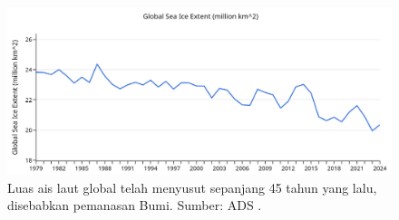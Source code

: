 \documentclass[10pt,twocolumn,letterpaper]{article}
\begin{document}
\begin{figure}[t]
\begin{center}
\includegraphics[width=1\textwidth]{ice.jpg}
\end{center}
   \caption{Luas ais laut global telah menyusut sepanjang 45 tahun yang lalu, disebabkan pemanasan Bumi. Sumber: ADS \cite{149}.}
\label{fig:24}
\end{figure}

\clearpage
\twocolumn

{\small
\renewcommand{\refname}{Rujukan}


}
\end{document}
